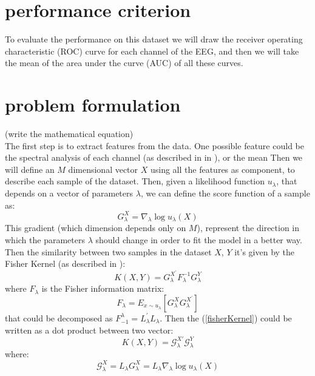 \documentclass[final,leqno,onefignum,onetabnum]{siamltexmm}
\begin{document}
\section{performance criterion}
To evaluate the performance on this dataset we will draw the receiver operating characteristic (ROC) curve for each channel of the EEG, and then we will take the mean of the area under the curve (AUC) of all these curves. 


\section{problem formulation}
(write the mathematical equation)\\
The first step is to extract features from the data. One possible feature could be the spectral analysis of each channel (as described in in \cite{features1}), or the mean  Then we will define an $M$ dimensional vector $X$ using all the features as component, to describe each sample of the dataset. Then, given a likelihood function $u_\lambda$, that depends on  a vector of parameters $\lambda$, we can define the score function of a sample as:
\begin{equation}\label{Glambda}
G_\lambda^X=\nabla_{\lambda }\log u_\lambda(X)  
\end{equation}
This gradient (which dimension depends only on $M$), represent the direction in which the parameters $\lambda$ should change in order to fit the model in a better way.
Then the similarity between two samples in the dataset $X$, $Y$ it's given by the Fisher Kernel (as described in \cite{fisher}):
\begin{equation}\label{fisherKernel}
K(X,Y)=G_\lambda^{X^{'}}F_\lambda^{-1} G_\lambda^Y
\end{equation} 
where $F_\lambda$ is the Fisher information matrix:
\begin{equation}
F_\lambda=E_{x\sim u_\lambda}[ G_\lambda^XG_\lambda^{X^{'}}]
\end{equation} 
that could be decomposed as $F_{-1}^\lambda=L_\lambda^{'}L_\lambda$. Then the (\ref{fisherKernel}) could be written as a dot product between two vector:
$$
K(X,Y)=\mathcal{G}_\lambda^{X'}\mathcal{G}_\lambda^{Y}
$$ 
where:
$$
\mathcal{G}_\lambda^{X}=L_\lambda G_\lambda^X=L_\lambda \nabla_{\lambda }\log u_\lambda(X)  
$$
\end{document}

